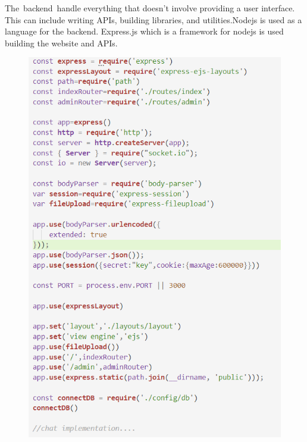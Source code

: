 \hspace{.2cm} 
The backend handle everything that doesn't involve providing a user interface. This can include writing APIs, building libraries, and utilities.Nodejs is used as a language for the backend. Express.js which is a framework for nodejs is used building the website and APIs.
\begin{figure}[H]
	\centering
	\includegraphics[scale=0.5]{server1.png}

\end{figure}
